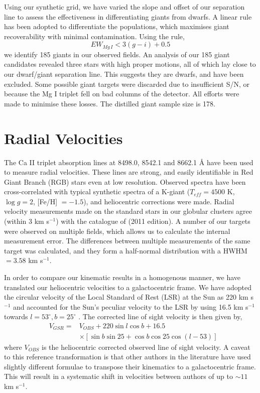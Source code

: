\documentclass[preprint2]{aastex}
\begin{document}
 Using our synthetic grid, we have varied the slope and offset of our separation line to assess the effectiveness in differentiating giants from dwarfs.  A linear rule has been adopted to differentiate the populations, which maximises giant recoverability with minimal contamination. Using the rule,
\begin{equation}
	EW_{Mg\,I} < 3(g-i) + 0.5
\end{equation}
\noindent we identify 185 giants in our observed fields. An analysis of our 185 giant candidates revealed three stars with high proper motions, all of which lay close to our dwarf/giant separation line. This suggests they are dwarfs, and have been excluded. Some possible giant targets were discarded due to insufficient S/N, or because the Mg I triplet fell on bad columns of the detector. All efforts were made to minimise these losses. The distilled giant sample size is 178.

	
\section{Radial Velocities}
\label{sec:kinematics}

The Ca II triplet absorption lines at 8498.0, 8542.1 and 8662.1 \AA{}  have been used to measure radial velocities. These lines are strong, and easily identifiable in Red Giant Branch (RGB) stars even at low resolution.  Observed spectra have been cross-correlated with typical synthetic spectra of a K-giant ($T_{eff} = 4500$ K, $\log{g} = 2$, [Fe/H] $= -1.5$), and heliocentric corrections were made. Radial velocity measurements made on the standard stars in our globular clusters agree (within 3 km s$^{-1}$) with the catalogue of \citet{Harris_1996} (2011 edition). A number of our targets were observed on multiple fields, which allows us to calculate the internal measurement error. The differences between multiple measurements of the same target was calculated, and they form a half-normal distribution with a HWHM $= 3.58$ km s$^{-1}$. 
	
In order to compare our kinematic results in a homogenous manner, we have translated our heliocentric velocities to a galactocentric frame. We have adopted the circular velocity of the Local Standard of Rest (LSR) at the Sun as 220 km s$^{-1}$ \citep{Kerr;Lynden-Bell_1986} and accounted for the Sun's peculiar velocity to the LSR by using 16.5 km s$^{-1}$ towards $l = 53^\circ, b = 25^\circ$ \citep{Mihalas;Binney_1981}. The corrected line of sight velocity is then given by,
\begin{eqnarray}
	&V_{GSR} = & V_{OBS} + 220\sin{l}\cos{b} + 16.5  \\
	& 		 &\times[\sin{b}\sin{25} + \cos{b}\cos{25}\cos{(l - 53)}] \nonumber
\end{eqnarray}
\noindent where $V_{OBS}$ is the heliocentric corrected observed line of sight velocity. A caveat to this reference transformation is that other authors in the literature have used slightly different formulae to transpose their kinematics to a galactocentric frame. This will result in a systematic shift in velocities between authors of up to $\sim11$ km s$^{-1}$. 
\end{document}
